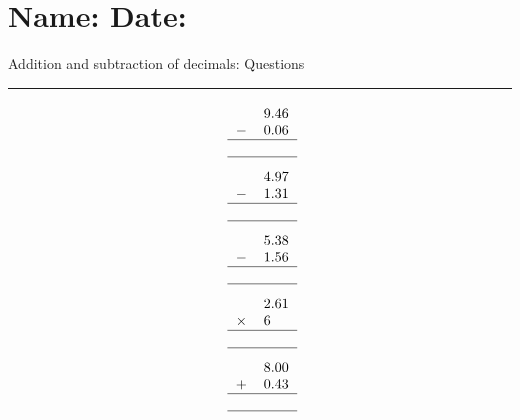 \documentclass[leqno, 12pt]{article}
\def \HeadingQuestions {\section*{\Large Name: \underline{\hspace{8cm}} \hfill Date: \underline{\hspace{3cm}}} \vspace{-3mm}
{Addition and subtraction of decimals: Questions} \vspace{1pt}\hrule}
\begin{document}
\HeadingQuestions
\vspace{-5mm}
\begin{multicols}{3}
\begin{equation}
    \raisebox{-0.8cm}{
        \begin{tabular}{c S[table-format=1.2]}
         &9.46 \tabularnewline
        $-$&0.06 \tabularnewline
        \hline
         & \tabularnewline
        \hline
    \end{tabular}}
\end{equation}
\vspace{-1pt}%
\begin{equation}
    \raisebox{-0.8cm}{
        \begin{tabular}{c S[table-format=1.2]}
         &4.97 \tabularnewline
        $-$&1.31 \tabularnewline
        \hline
         & \tabularnewline
        \hline
    \end{tabular}}
\end{equation}
\vspace{-1pt}%
\begin{equation}
    \raisebox{-0.8cm}{
        \begin{tabular}{c S[table-format=1.2]}
         &5.38 \tabularnewline
        $-$&1.56 \tabularnewline
        \hline
         & \tabularnewline
        \hline
    \end{tabular}}
\end{equation}
\vspace{-1pt}%
\begin{equation}
    \raisebox{-0.8cm}{
        \begin{tabular}{c S[table-format=1.2]}
         &2.61 \tabularnewline
        $\times$&6 \tabularnewline
        \hline
         & \tabularnewline
        \hline
    \end{tabular}}
\end{equation}
\vspace{-1pt}%
\begin{equation}
    \raisebox{-0.8cm}{
        \begin{tabular}{c S[table-format=1.2]}
         &8.00 \tabularnewline
        $+$&0.43 \tabularnewline
        \hline
         & \tabularnewline
        \hline
    \end{tabular}}
\end{equation}
\vspace{-1pt}%
\begin{equation}
    \raisebox{-0.8cm}{
}
\end{equation}
\end{multicols}
\end{document}
